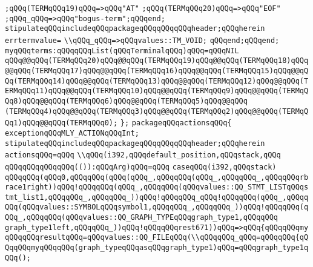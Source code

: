 \verb|;qQQq(TERMqQQq19)qQQq=>qQQq"AT"|\newline
\verb|;qQQq(TERMqQQq20)qQQq=>qQQq"EOF"|\newline
\verb|;qQQq_qQQq=>qQQq"bogus-term";qQQqend;|\newline
\verb|stipulateqQQqincludeqQQqpackageqQQqqQQqqQQqheader;qQQqherein|\newline
\verb|errtermvalue=|\newline
\verb|\\qQQq_qQQq=>qQQqvalues::TM_VOID;|\newline
\verb|qQQqend;qQQqend;|\newline
\verb|myqQQqterms:qQQqqQQqList(qQQqTerminalqQQq)qQQq=qQQqNIL|\newline
\verb|qQQq@@qQQq(TERMqQQq20)qQQq@@qQQq(TERMqQQq19)qQQq@@qQQq(TERMqQQq18)qQQq@@qQQq(TERMqQQq17)qQQq@@qQQq(TERMqQQq16)qQQq@@qQQq(TERMqQQq15)qQQq@@qQQq(TERMqQQq14)qQQq@@qQQq(TERMqQQq13)qQQq@@qQQq(TERMqQQq12)qQQq@@qQQq(TERMqQQq11)qQQq@@qQQq(TERMqQQq10)qQQq@@qQQq(TERMqQQq9)qQQq@@qQQq(TERMqQQq8)qQQq@@qQQq(TERMqQQq6)qQQq@@qQQq(TERMqQQq5)qQQq@@qQQq|\newline
\verb|(TERMqQQq4)qQQq@@qQQq(TERMqQQq3)qQQq@@qQQq(TERMqQQq2)qQQq@@qQQq(TERMqQQq1)qQQq@@qQQq(TERMqQQq0);|\newline
\verb|};|\newline
\verb|packageqQQqactionsqQQq{|\newline
\verb|exceptionqQQqMLY_ACTIONqQQqInt;|\newline
\verb|stipulateqQQqincludeqQQqpackageqQQqqQQqqQQqheader;qQQqherein|\newline
\verb|actionsqQQq=qQQq|\newline
\verb|\\qQQq(i392,qQQqdefault_position,qQQqstack,qQQq|\newline
\verb|qQQqqQQqqQQqqQQq(()):qQQqArg)qQQq=qQQq|\newline
\verb|caseqQQq(i392,qQQqstack)|\newline
\verb|qQQqqQQq(qQQq0,qQQqqQQq(qQQq(qQQq_,qQQqqQQq(qQQq_,qQQqqQQq_,qQQqqQQqrbrace1right))qQQq!qQQqqQQq(qQQq_,qQQqqQQq(qQQqvalues::QQ_STMT_LISTqQQqstmt_list1,qQQqqQQq_,qQQqqQQq_))qQQq!qQQqqQQq_qQQq!qQQqqQQq(qQQq_,qQQqqQQq(qQQqvalues::SYMBOLqQQqsymbol1,qQQqqQQq_,qQQqqQQq_))qQQq!qQQqqQQq(qQQq_,qQQqqQQq(qQQqvalues::QQ_GRAPH_TYPEqQQqgraph_type1,qQQqqQQq|\newline
\verb|graph_type1left,qQQqqQQq_))qQQq!qQQqqQQqrest671))qQQq=>qQQq{qQQqqQQqmyqQQqqQQqresultqQQq=qQQqvalues::QQ_FILEqQQq(\\qQQqqQQq_qQQq=qQQqqQQq{qQQqqQQqmyqQQqqQQq(graph_typeqQQqasqQQqgraph_type1)qQQq=qQQqgraph_type1qQQq();|\newline
